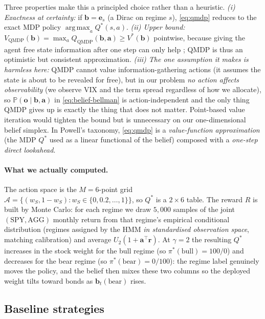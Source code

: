 \documentclass[11pt]{article}
\theoremstyle{plain1}
\theoremstyle{definition1}
\newcommand{\Prb}{\mathbb{P}}
\newcommand{\argmax}{\operatorname*{arg\,max}}
\newcommand{\1}{\mathbf{1}}
\newcommand{\bel}{\mathbf{b}}
\newcommand{\action}{\mathcal{A}}
\begin{document}
Three properties make this a principled choice rather than a heuristic. \emph{(i) Exactness at certainty:} if $\bel=\mathbf{e}_s$ (a Dirac on regime $s$), \cref{eq:qmdp} reduces to the exact MDP policy $\argmax_a Q^\ast(s,a)$. \emph{(ii) Upper bound:} $V_{\mathrm{QMDP}}(\bel)=\max_a Q_{\mathrm{QMDP}}(\bel,\mathbf a)\ge V^\ast(\bel)$ pointwise, because giving the agent free state information after one step can only help \cite{hauskrecht2000}; QMDP is thus an optimistic but consistent approximation. \emph{(iii) The one assumption it makes is harmless here:} QMDP cannot value information-gathering actions (it assumes the state is about to be revealed for free), but in our problem \emph{no action affects observability} (we observe VIX and the term spread regardless of how we allocate), so $\Prb(\mathbf{o}\mid\bel,\mathbf{a})$ in \cref{eq:belief-bellman} is action-independent and the only thing QMDP gives up is exactly the thing that does not matter. Point-based value iteration \cite{pineau2003} would tighten the bound but is unnecessary on our one-dimensional belief simplex. In Powell's \cite{powell2019} taxonomy, \cref{eq:qmdp} is a \emph{value-function approximation} (the MDP $Q^\ast$ used as a linear functional of the belief) composed with a \emph{one-step direct lookahead}.

\paragraph{What we actually computed.} The action space is the $M{=}6$-point grid $\action=\{(w_S,1{-}w_S):w_S\in\{0,0.2,\dots,1\}\}$, so $Q^\ast$ is a $2\times 6$ table. The reward $R$ is built by Monte Carlo: for each regime we draw $5{,}000$ samples of the joint $(\text{SPY},\text{AGG})$ monthly return from that regime's empirical conditional distribution (regimes assigned by the HMM \emph{in standardised observation space}, matching calibration) and average $U_2(1+\mathbf a^\top\mathbf r)$. At $\gamma{=}2$ the resulting $Q^\ast$ increases in the stock weight for the bull regime (so $\pi^\ast(\text{bull})=100/0$) and decreases for the bear regime (so $\pi^\ast(\text{bear})=0/100$): the regime label genuinely moves the policy, and the belief then mixes these two columns so the deployed weight tilts toward bonds as $\bel_t(\text{bear})$ rises.

\subsection{Baseline strategies}\label{sec:baselines}
\end{document}
